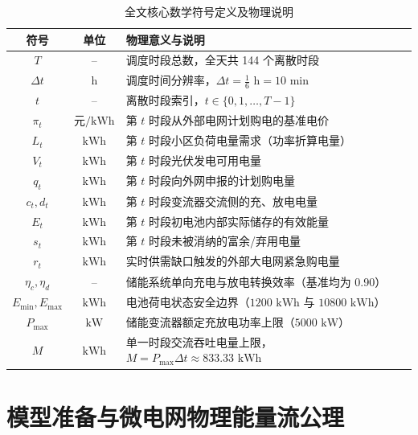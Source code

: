 \documentclass[withoutpreface]{cumcmthesis}
\begin{document}
\begin{table}[htbp]
\centering
\renewcommand{\arraystretch}{1.2}
\setlength{\tabcolsep}{6pt}
\caption{全文核心数学符号定义及物理说明}
\label{tab:notation}
\begin{tabular}{ccl}
\toprule[1.5pt]
符号 & 单位 & 物理意义与说明 \\
\midrule[1pt]
$T$          & --        & 调度时段总数，全天共 144 个离散时段 \\
$\Delta t$   & $\text{h}$ & 调度时间分辨率，$\Delta t = \frac{1}{6}\text{ h} = 10\text{ min}$ \\
$t$          & --        & 离散时段索引，$t \in \{0, 1, \dots, T-1\}$ \\
$\pi_t$      & $\text{元/kWh}$ & 第 $t$ 时段从外部电网计划购电的基准电价 \\
$L_t$        & $\text{kWh}$ & 第 $t$ 时段小区负荷电量需求（功率折算电量） \\
$V_t$        & $\text{kWh}$ & 第 $t$ 时段光伏发电可用电量 \\
$q_t$        & $\text{kWh}$ & 第 $t$ 时段向外网申报的计划购电量 \\
$c_t, d_t$   & $\text{kWh}$ & 第 $t$ 时段变流器交流侧的充、放电电量 \\
$E_t$        & $\text{kWh}$ & 第 $t$ 时段初电池内部实际储存的有效能量 \\
$s_t$        & $\text{kWh}$ & 第 $t$ 时段未被消纳的富余/弃用电量 \\
$r_t$        & $\text{kWh}$ & 实时供需缺口触发的外部大电网紧急购电量 \\
$\eta_c, \eta_d$ & --    & 储能系统单向充电与放电转换效率（基准均为 0.90） \\
$E_{\min}, E_{\max}$ & $\text{kWh}$ & 电池荷电状态安全边界（$1200\text{ kWh}$ 与 $10800\text{ kWh}$） \\
$P_{\max}$   & $\text{kW}$  & 储能变流器额定充放电功率上限（$5000\text{ kW}$） \\
$M$          & $\text{kWh}$ & 单一时段交流吞吐电量上限，$M = P_{\max}\Delta t \approx 833.33\text{ kWh}$ \\
\bottomrule[1.5pt]
\end{tabular}
\end{table}


\section{模型准备与微电网物理能量流公理}
\end{document}
